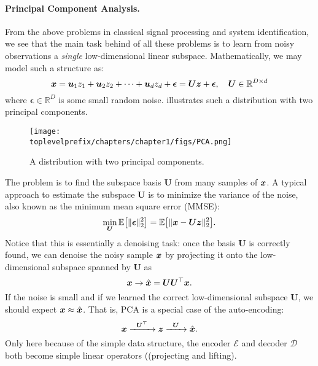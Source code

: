 \documentclass[../../book-main.tex]{subfiles}
\begin{document}
\paragraph{Principal Component Analysis.}
From the above problems in classical signal processing and system identification, we see that the main task behind of all these problems is to learn from noisy observations a {\em single} low-dimensional linear subspace. Mathematically, we may model such a structure as:
\begin{equation}
    \bm{x} = \boldsymbol{u}_1 z_1 + \boldsymbol{u}_2 z_2 + \cdots + \boldsymbol{u}_d z_d + \boldsymbol{\epsilon} =  \boldsymbol{U} \bm{z} + \boldsymbol{\epsilon}, \quad \boldsymbol{U} \in \mathbb{R}^{D\times d}
    \label{eqn:PCA-model}
\end{equation}
where $\boldsymbol{\epsilon} \in \mathbb{R}^D$ is some small random noise.  illustrates such a distribution with two principal components.
\begin{figure}
    \centering
    \texttt{[image: \\toplevelprefix/chapters/chapter1/figs/PCA.png]}
    \caption{A distribution with two principal components.}
    \label{fig:PCA}
\end{figure}
The problem is to find the subspace basis $\boldsymbol{U}$ from many samples of $\bm{x}$. A typical approach to estimate the subspace $\boldsymbol{U}$ is to minimize the variance of the noise, also known as the minimum mean square error (MMSE):
\begin{equation}
    \min_{\boldsymbol{U}} \mathbb{E}\big[\|\boldsymbol{\epsilon}\|_2^2\big] = \mathbb{E}\big[\|\bm{x} - \boldsymbol{U} \bm{z}\|_2^2\big].
\end{equation}
Notice that this is essentially a denoising task: once the basis $\boldsymbol{U}$ is correctly found, we can denoise the noisy sample $\bm{x}$ by projecting it onto the low-dimensional subspace spanned by $\boldsymbol{U}$ as 
\begin{equation}
\bm{x} \rightarrow \hat {\bm{x}} = \boldsymbol{U}\boldsymbol{U}^\top \bm{x}. 
\end{equation}
If the noise is small and if we learned the correct low-dimensional subspace $\boldsymbol{U}$, we should expect $\bm{x} \approx \hat {\bm{x}}$. That is, PCA is a special case of the auto-encoding:
\begin{equation}
    \bm{x}   \xrightarrow{\hspace{2mm} \boldsymbol{U}^\top\hspace{2mm}} \bm{z}  \xrightarrow{\hspace{2mm} \boldsymbol{U} \hspace{2mm}} \hat {\bm{x}}.
       \label{eqn:auto-encoding-PCA}
\end{equation}
Only here because of the simple data structure, the encoder $\mathcal{E}$ and decoder $\mathcal{D}$ both become simple linear operators ((projecting and lifting).
\end{document}

